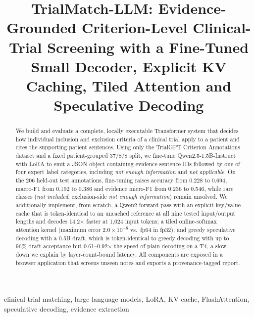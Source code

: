 \documentclass[conference]{IEEEtran}
\begin{document}
\title{TrialMatch-LLM: Evidence-Grounded Criterion-Level Clinical-Trial Screening with a Fine-Tuned Small Decoder, Explicit KV Caching, Tiled Attention and Speculative Decoding}

\author{
}

\maketitle

\begin{abstract}
We build and evaluate a complete, locally executable Transformer system that decides how individual inclusion and exclusion criteria of a clinical trial apply to a patient and cites the supporting patient sentences. Using only the TrialGPT Criterion Annotations dataset and a fixed patient-grouped 37/8/8 split, we fine-tune Qwen2.5-1.5B-Instruct with LoRA to emit a JSON object containing evidence sentence IDs followed by one of four expert label categories, including \emph{not enough information} and \emph{not applicable}. On the 206 held-out test annotations, fine-tuning raises accuracy from 0.228 to 0.694, macro-F1 from 0.192 to 0.386 and evidence micro-F1 from 0.236 to 0.546, while rare classes (\emph{not included}, exclusion-side \emph{not enough information}) remain unsolved. We additionally implement, from scratch, a Qwen2 forward pass with an explicit key/value cache that is token-identical to an uncached reference at all nine tested input/output lengths and decodes 14.2$\times$ faster at 1{,}024 input tokens; a tiled online-softmax attention kernel (maximum error $2.0\times10^{-6}$ vs.\ fp64 in fp32); and greedy speculative decoding with a 0.5B draft, which is token-identical to greedy decoding with up to 96\% draft acceptance but 0.61--0.92$\times$ the speed of plain decoding on a T4, a slow-down we explain by layer-count-bound latency. All components are exposed in a browser application that screens unseen notes and exports a provenance-tagged report.
\end{abstract}

\begin{IEEEkeywords}
clinical trial matching, large language models, LoRA, KV cache, FlashAttention, speculative decoding, evidence extraction
\end{IEEEkeywords}
\end{document}
